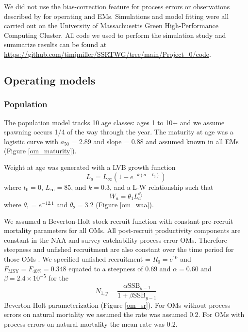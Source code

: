 \documentclass[
  12pt,
]{article}
\newcommand{\Fmsy}{\ensuremath{F_{\text{MSY}}}\xspace}
\begin{document}
We did not use the bias-correction feature for process errors or
observations described by \citet{stockmiller21} for operating and EMs.
Simulations and model fitting were all carried out on the University of
Massachusetts Green High-Performance Computing Cluster. All code we used
to perform the simulation study and summarize results can be found at
\url{https://github.com/timjmiller/SSRTWG/tree/main/Project_0/code}.

\hypertarget{operating-models}{%
\subsection*{Operating models}\label{operating-models}}

\hypertarget{population}{%
\subsubsection*{Population}\label{population}}

The population model tracks 10 age classes: ages 1 to 10+ and we assume
spawning occurs 1/4 of the way through the year. The maturity at age was
a logistic curve with \(a_{50}\) = 2.89 and slope = 0.88 and assumed
known in all EMs (Figure \ref{om_maturity}).

Weight at age was generated with a LVB growth function \[
L_a = L_{\infty}\left(1 - e^{-k(a - t_0)}\right)
\] where \(t_0 = 0\), \(L_\infty = 85\), and \(k = 0.3\), and a L-W
relationship such that \[
W_a = \theta_1 L_a^{\theta_2}
\] where \(\theta_1 = e^{-12.1}\) and \(\theta_2 = 3.2\) (Figure
\ref{om_waa}).

We assumed a Beverton-Holt stock recruit function with constant
pre-recruit mortality parameters for all OMs. All post-recruit
productivity components are constant in the NAA and survey catchability
process error OMs. Therefore steepness and unfished recruitment are also
constant over the time period for those OMs \citep{millerbrooks21}. We
specified unfished recruitment = \(R_0 = e^{10}\) and
\(\Fmsy = F_{40\%} = 0.348\) equated to a steepness of 0.69 and
\(\alpha=0.60\) and \(\beta = 2.4 \times 10^{-5}\) for the \[
N_{1,y} = \frac{\alpha \text{SSB}_{y-1}}{1 + \beta \text{SSB}_{y-1}} 
\] Beverton-Holt parameterization (Figure \ref{om_sr}). For OMs without
process errors on natural mortality we assumed the rate was assumed 0.2.
For OMs with process errors on natural mortality the mean rate was 0.2.
\end{document}
